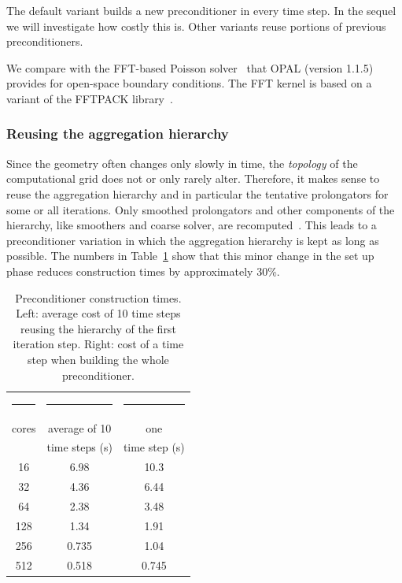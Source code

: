 \documentclass[a4paper,10pt,3p,final,pdftex]{elsarticle}
\begin{document}
The default variant builds a new preconditioner in every time step.  In
the sequel we will investigate how costly this is.  Other variants reuse
portions of previous preconditioners.

We compare with the FFT-based Poisson solver~\cite{hoea:88} that
\textsc{OPAL} (version 1.1.5) provides for open-space boundary conditions.  
The FFT kernel is based  on a variant of the FFTPACK library~\cite{FFTPACK, Swar:82}.

\subsubsection*{Reusing the aggregation hierarchy}

Since the geometry often changes only slowly in time, the
\emph{topology} of the computational grid does not or only rarely alter.
Therefore, it makes sense to reuse the aggregation hierarchy and in
particular the tentative prolongators for some or all iterations.  Only
smoothed prolongators and other components of the hierarchy, like
smoothers and coarse solver, are recomputed~\cite[p.16]{gsht:06}.
This leads to a preconditioner variation in which the aggregation
hierarchy is kept as long as possible.  The numbers in
Table~\ref{tbl:timings_reuse_hierarchy} show that this minor change in
the set up phase reduces construction times by approximately 30\%.

\begin{table}[ht]
  \begin{center}
    \begin{tabular}{ccc}
      \hline
      \rule{15mm}{0mm} & \rule{30mm}{0mm} & \rule{30mm}{0mm} \\[-4mm]
      cores & average of 10 & one \\
      &time steps (s) &  time step (s) \\
      \hline
      16  & 6.98 & 10.3 \\
      32  & 4.36 &  6.44 \\
      64  & 2.38 &  3.48 \\
      128 & 1.34 &  1.91 \\ 
      256 & 0.735 &  1.04 \\
      512 & 0.518 &  0.745 \\
      \hline
    \end{tabular}
    \caption{Preconditioner construction times.  Left: average cost of
      10 time steps reusing the hierarchy of the first iteration step.
      Right: cost of a time step when building the whole
      preconditioner.
    }
    \label{tbl:timings_reuse_hierarchy}
  \end{center}
\end{table}
\end{document}
